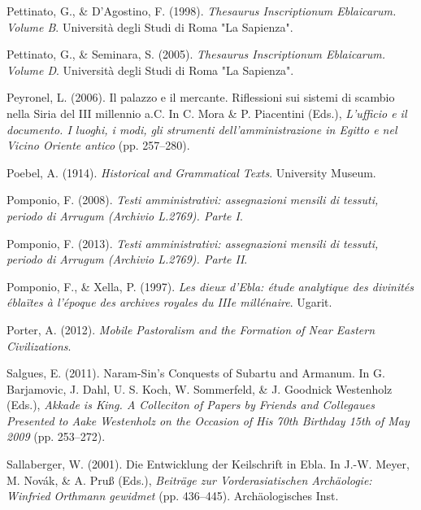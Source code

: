 \documentclass[
]{book}
\newlength{\cslhangindent}
\newlength{\cslentryspacingunit} %
\newenvironment{CSLReferences}[2] %
 {%
  \setlength{\parindent}{0pt}
  \ifodd #1
  \let\oldpar\par
  \def\par{\hangindent=\cslhangindent\oldpar}
  \fi
  \setlength{\parskip}{#2\cslentryspacingunit}
 }%
 {}
\begin{document}
\begin{CSLReferences}{1}{0}
\leavevmode{}%
Pettinato, G., \& D'Agostino, F. (1998). \emph{{Thesaurus Inscriptionum Eblaicarum. Volume B}}. Universit{à} degli Studi di Roma "La Sapienza".

\leavevmode{}%
Pettinato, G., \& Seminara, S. (2005). \emph{{Thesaurus Inscriptionum Eblaicarum. Volume D}}. Universit{à} degli Studi di Roma "La Sapienza".

\leavevmode{}%
Peyronel, L. (2006). {Il palazzo e il mercante. Riflessioni sui sistemi di scambio nella Siria del III millennio a.C.} In C. Mora \& P. Piacentini (Eds.), \emph{{L'ufficio e il documento. I luoghi, i modi, gli strumenti dell'amministrazione in Egitto e nel Vicino Oriente antico}} (pp. 257--280).

\leavevmode{}%
Poebel, A. (1914). \emph{Historical and {Grammatical Texts}}. University Museum.

\leavevmode{}%
Pomponio, F. (2008). \emph{{Testi amministrativi: assegnazioni mensili di tessuti, periodo di Arrugum (Archivio L.2769). Parte I}}.

\leavevmode{}%
Pomponio, F. (2013). \emph{{Testi amministrativi: assegnazioni mensili di tessuti, periodo di Arrugum (Archivio L.2769). Parte II}}.

\leavevmode{}%
Pomponio, F., \& Xella, P. (1997). \emph{{Les dieux d'Ebla: {é}tude analytique des divinit{é}s {é}bla{ï}tes {à} l'{é}poque des archives royales du IIIe mill{é}naire}}. Ugarit.

\leavevmode{}%
Porter, A. (2012). \emph{Mobile {Pastoralism} and the {Formation} of {Near Eastern Civilizations}}.

\leavevmode{}%
Salgues, E. (2011). Naram-{Sin}'s {Conquests} of {Subartu} and {Armanum}. In G. Barjamovic, J. Dahl, U. S. Koch, W. Sommerfeld, \& J. Goodnick Westenholz (Eds.), \emph{Akkade is {King}. {A Colleciton} of {Papers} by {Friends} and {Collegaues Presented} to {Aake Westenholz} on the {Occasion} of {His} 70th {Birthday} 15th of {May} 2009} (pp. 253--272).

\leavevmode{}%
Sallaberger, W. (2001). {Die Entwicklung der Keilschrift in Ebla}. In J.-W. Meyer, M. Novák, \& A. Pruß (Eds.), \emph{{Beitr{ä}ge zur Vorderasiatischen Arch{ä}ologie: Winfried Orthmann gewidmet}} (pp. 436--445). Arch{ä}ologisches Inst.


\end{CSLReferences}
\end{document}
